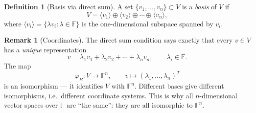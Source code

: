 \documentclass[11pt]{article}
\theoremstyle{definition}
\newtheorem{definition}{Definition}[section]
\newtheorem{remark}{Remark}[section]
\theoremstyle{plain}
\begin{document}
\begin{definition}[Basis via direct sum]
  A set $\{v_1,\ldots,v_n\}\subset V$ is a \emph{basis} of $V$ if
  \[
    V = \langle v_1\rangle \oplus \langle v_2\rangle \oplus \cdots
        \oplus \langle v_n\rangle,
  \]
  where $\langle v_i\rangle = \{\lambda v_i : \lambda\in\mathbb{F}\}$ is the
  one-dimensional subspace spanned by $v_i$.
\end{definition}

\begin{remark}[Coordinates]
  The direct sum condition says exactly that every $v\in V$ has a
  \emph{unique} representation
  \[
    v = \lambda_1 v_1 + \lambda_2 v_2 + \cdots + \lambda_n v_n,
    \qquad \lambda_i\in\mathbb{F}.
  \]
  The map
  \[
    \varphi_B : V \longrightarrow \mathbb{F}^n,
    \qquad
    v \longmapsto (\lambda_1,\ldots,\lambda_n)^T
  \]
  is an isomorphism --- it identifies $V$ with $\mathbb{F}^n$.  Different
  bases give different isomorphisms, i.e.\ different coordinate systems.
  This is why all $n$-dimensional vector spaces over $\mathbb{F}$ are
  ``the same'': they are all isomorphic to $\mathbb{F}^n$.
\end{remark}
\end{document}
